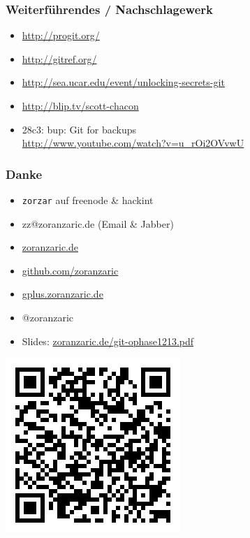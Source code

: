 \documentclass[]{beamer}
\begin{document}
\begin{frame}
	\frametitle{Weiterführendes / Nachschlagewerk}
	\begin{itemize}
		\item
			\url{http://progit.org/}
		\item
			\url{http://gitref.org/}
		\item
			\url{http://sea.ucar.edu/event/unlocking-secrets-git}
		\item
			\url{http://blip.tv/scott-chacon}
		\item
			28c3: bup: Git for backups\\
			\url{http://www.youtube.com/watch?v=u_rOi2OVvwU}
	\end{itemize}
\end{frame}

\begin{frame}[fragile]
	\frametitle{Danke}
	\begin{itemize}
		\item
			\verb|zorzar| auf freenode \& hackint
		\item
			zz@zoranzaric.de (Email \& Jabber)
		\item
			\url{zoranzaric.de}
		\item
			\url{github.com/zoranzaric}
		\item
			\url{gplus.zoranzaric.de}
		\item
			@zoranzaric\\[0.5cm]
		\item
			Slides: \url{zoranzaric.de/git-ophase1213.pdf}
	\end{itemize}
\end{frame}

\begin{frame}
	\includegraphics{qr-code.png}
\end{frame}
\end{document}
